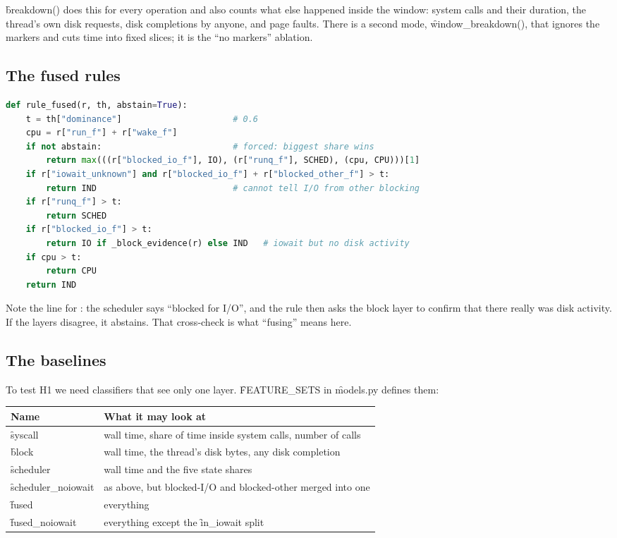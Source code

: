 \documentclass[11pt]{article}
\begin{document}
\f{breakdown()} does this for every operation and also counts what else happened inside the window: system calls and their duration, the thread's own disk requests, disk completions by anyone, and page faults. There is a second mode, \f{window\_breakdown()}, that ignores the markers and cuts time into fixed slices; it is the ``no markers'' ablation.

\subsection{The fused rules}
\begin{lstlisting}[language=Python]
def rule_fused(r, th, abstain=True):
    t = th["dominance"]                      # 0.6
    cpu = r["run_f"] + r["wake_f"]
    if not abstain:                          # forced: biggest share wins
        return max(((r["blocked_io_f"], IO), (r["runq_f"], SCHED), (cpu, CPU)))[1]
    if r["iowait_unknown"] and r["blocked_io_f"] + r["blocked_other_f"] > t:
        return IND                           # cannot tell I/O from other blocking
    if r["runq_f"] > t:
        return SCHED
    if r["blocked_io_f"] > t:
        return IO if _block_evidence(r) else IND   # iowait but no disk activity
    if cpu > t:
        return CPU
    return IND
\end{lstlisting}
Note the line for \IOW: the scheduler says ``blocked for I/O'', and the rule then asks the block layer to confirm that there really was disk activity. If the layers disagree, it abstains. That cross-check is what ``fusing'' means here.

\subsection{The baselines}
To test H1 we need classifiers that see only one layer. \f{FEATURE\_SETS} in \f{models.py} defines them:

\begin{center}
\begin{tabularx}{\textwidth}{@{}lY@{}}
\toprule
Name & What it may look at \\
\midrule
\f{syscall} & wall time, share of time inside system calls, number of calls \\
\f{block} & wall time, the thread's disk bytes, any disk completion \\
\f{scheduler} & wall time and the five state shares \\
\f{scheduler\_noiowait} & as above, but blocked-I/O and blocked-other merged into one \\
\f{fused} & everything \\
\f{fused\_noiowait} & everything except the \f{in\_iowait} split \\
\bottomrule
\end{tabularx}
\end{center}
\end{document}
